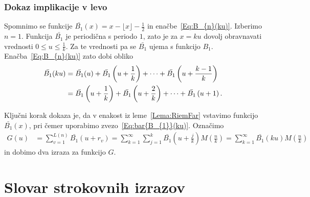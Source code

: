 \documentclass[mat1]{fmfdelo}
\begin{document}
\subsubsection{Dokaz implikacije v levo}
Spomnimo se funkcije $ \bar{B_{1}}(x) = x - \lfloor x \rfloor - \frac{1}{2} $ in enačbe~\ref{Eq:B_{n}(ku)}. Izberimo $n=1$. Funkcija $\bar{B_{1}}$ je periodična s periodo $1$, zato je za $x=ku$ dovolj obravnavati vrednosti $0 \leq u \leq \frac{1}{k}$. Za te vrednosti pa se $\bar{B_{1}}$ ujema s funkcijo $B_{1}$. Enačba~\ref{Eq:B_{n}(ku)} zato dobi obliko
\begin{align}
\label{Eq:bar{B_{1}}(ku)}
\bar{B_{1}}(ku) &= \bar{B_{1}}(u) + \bar{B_{1}} \left( u + \frac{1}{k} \right) + \dots + \bar{B_{1}} \left( u + \frac{k-1}{k} \right) \nonumber \\
			&= \bar{B_{1}} \left( u + \frac{1}{k} \right) + \bar{B_{1}} \left( u + \frac{2}{k} \right) + \dots + \bar{B_{1}} \left( u + 1 \right).
\end{align}

Ključni korak dokaza je, da v enakost iz leme~\ref{Lema:RiemFar} vstavimo funkcijo $ \bar{B_{1}}(x)$, pri čemer uporabimo zvezo~\ref{Eq:bar{B_{1}}(ku)}. Označimo
\begin{align}
G(u) &= \sum_{v=1}^{L(n)} \bar{B_{1}}(u+r_v) = \sum_{k=1}^{\infty} \sum_{j=1}^{k} \bar{B_{1}} \left(u + \frac{j}{k} \right) M \left(\frac{n}{k} \right)
	= \sum_{k=1}^{\infty} \bar{B_{1}}(ku) M \left(\frac{n}{k} \right)
\end{align}
in dobimo dva izraza za funkcijo $G$.

%


\section*{Slovar strokovnih izrazov}

\geslo{}{}
\geslo{}{}
\end{document}

